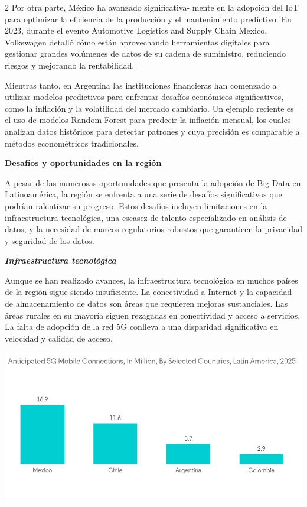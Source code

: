 \documentclass[12pt,spanish,Letterpaper,openany]{book}
\begin{document}
\begin {multicols}{2}
Por otra parte, México ha avanzado significativa-
mente en la adopción del IoT para optimizar la eficiencia de la producción y el mantenimiento predictivo. En 2023, durante el evento Automotive Logistics and Supply Chain Mexico, Volkswagen detalló cómo están aprovechando herramientas digitales para gestionar grandes volúmenes de datos de su
cadena de suministro, reduciendo riesgos y mejorando la rentabilidad.

Mientras tanto, en Argentina las instituciones financieras han comenzado a utilizar modelos predictivos para enfrentar desafíos económicos significativos, como la inflación y la volatilidad del mercado cambiario. Un ejemplo reciente es el uso de modelos Random Forest para predecir la inflación mensual, los cuales analizan datos históricos para detectar
patrones y cuya precisión es comparable a métodos econométricos tradicionales.

\textbf{Desafíos y oportunidades en la región}

A pesar de las numerosas oportunidades que presenta la adopción de Big Data en Latinoamérica, la región se enfrenta a una serie de desafíos significativos que podrían ralentizar su progreso. Estos desafíos incluyen limitaciones en la infraestructura tecnológica, una escasez de talento especializado en análisis de datos, y la necesidad de marcos regulatorios robustos que garanticen la privacidad y seguridad de los datos.

\emph{\textbf{Infraestructura tecnológica}}

Aunque se han realizado avances, la infraestructura tecnológica en muchos países de la región sigue siendo insuficiente. La conectividad a Internet y la capacidad de almacenamiento de datos son áreas que requieren mejoras sustanciales. Las áreas rurales en su mayoría siguen rezagadas en conectividad y acceso a servicios. La falta de adopción de la red 5G conlleva a una disparidad significativa en velocidad y calidad de acceso.

\begin {flushleft}
\noindent\begin{minipage}[c]{\columnwidth}

\begin{center}\includegraphics[width=1\linewidth]{imagenes_articulos/sp57_01} \end{center}


\end{minipage}
\end{flushleft}
\end{multicols}
\end{document}
